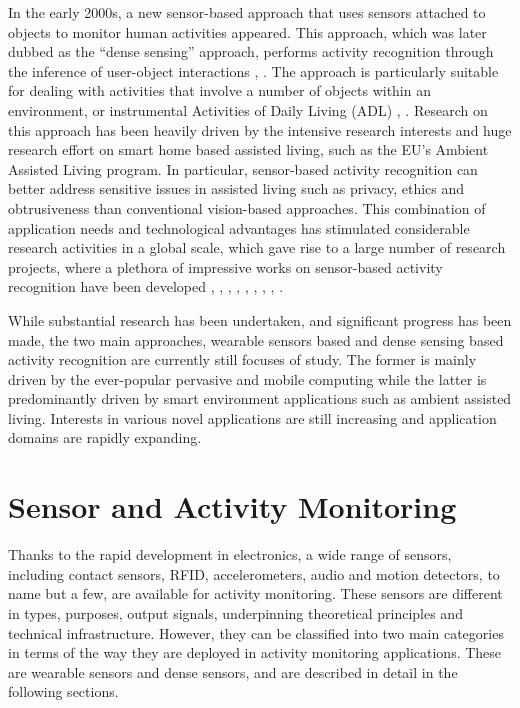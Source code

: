 In the early 2000s, a new sensor-based approach that uses sensors attached to objects to monitor human activities appeared. This approach, which was later dubbed as the “dense sensing” approach, performs activity recognition through the inference of user-object interactions \cite{Bao2004}, \cite{Patterson2003}. The approach is particularly suitable for dealing with activities that involve a number of objects within an environment, or instrumental Activities of Daily Living (ADL) \cite{Chan2008}, \cite{Nugent2009}. Research on this approach has been heavily driven by the intensive research interests and huge research effort on smart home based assisted living, such as the EU’s Ambient Assisted Living program. In particular, sensor-based activity recognition can better address sensitive issues in assisted living such as privacy, ethics and obtrusiveness than conventional vision-based approaches. This combination of application needs and technological advantages has stimulated considerable research activities in a global scale, which gave rise to a large number of research projects, where a plethora of impressive works on sensor-based activity recognition have been developed \cite{Kern2003}, \cite{Mantyjarvi2001}, \cite{Philipose2004}, \cite{Patterson2005}, \cite{Buettner2009}, \cite{Wren2006}, \cite{Gu2009}, \cite{Patterson2003}, \cite{Liao2007}.

While substantial research has been undertaken, and significant progress has been made, the two main approaches, wearable sensors based and dense sensing based activity recognition are currently still focuses of study. The former is mainly driven by the ever-popular pervasive and mobile computing while the latter is predominantly driven by smart environment applications such as ambient assisted living. Interests in various novel applications are still increasing and application domains are rapidly expanding.

\section{Sensor and Activity Monitoring}
\label{sec:soa:monitoring}

Thanks to the rapid development in electronics, a wide range of sensors, including contact sensors, RFID, accelerometers, audio and motion detectors, to name but a few, are available for activity monitoring. These sensors are different in types, purposes, output signals, underpinning theoretical principles and technical infrastructure. However, they can be classified into two main categories in terms of the way they are deployed in activity monitoring applications. These are wearable sensors and dense sensors, and are described in detail in the following sections.

